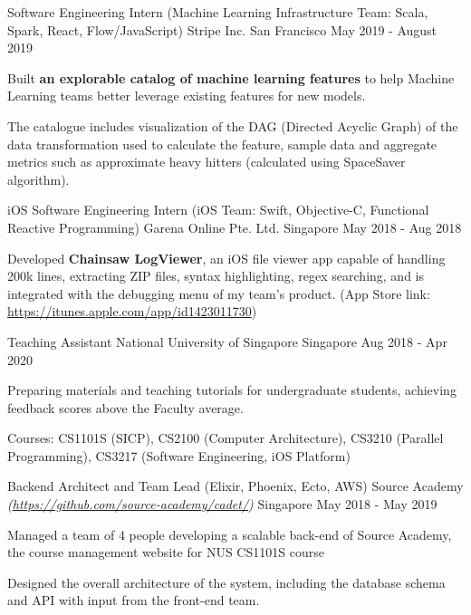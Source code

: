 \begin{cventries}
  \cventry
  {Software Engineering Intern (Machine Learning Infrastructure Team: Scala, Spark, React, Flow/JavaScript)} %
  {Stripe Inc.} %
  {San Francisco} %
  {May 2019 - August 2019} %
  {
    \begin{cvitems}
      \item {Built \textbf{an explorable catalog of machine learning features} to help Machine Learning teams better leverage existing features for new models.}
      \item {The catalogue includes visualization of the DAG (Directed Acyclic Graph) of the data transformation used to calculate the feature, sample data and aggregate metrics such as approximate heavy hitters (calculated using SpaceSaver algorithm).}
    \end{cvitems}
  }

  \cventry
  {iOS Software Engineering Intern (iOS Team: Swift, Objective-C, Functional Reactive Programming)} %
  {Garena Online Pte. Ltd.} %
  {Singapore} %
  {May 2018 - Aug 2018} %
  {
    \begin{cvitems}
      \item {Developed \textbf{Chainsaw LogViewer}, an iOS file viewer app capable of handling 200k lines, extracting ZIP files, syntax highlighting, regex searching, and is integrated with the debugging menu of my team's product. (App Store link: \url{https://itunes.apple.com/app/id1423011730})}
    \end{cvitems}
  }

  \cventry
  {Teaching Assistant} %
  {National University of Singapore} %
  {Singapore} %
  {Aug 2018 - Apr 2020} %
  {
    \begin{cvitems}
      \item {Preparing materials and teaching tutorials for undergraduate students, achieving feedback scores above the Faculty average.}
      \item {Courses: CS1101S (SICP), CS2100 (Computer Architecture), CS3210 (Parallel Programming), CS3217 (Software Engineering, iOS Platform)}
    \end{cvitems}
  }

  \cventry
  {Backend Architect and Team Lead (Elixir, Phoenix, Ecto, AWS)} %
  {Source Academy \textmd{\em\tiny(\url{https://github.com/source-academy/cadet/})}} %
  {Singapore} %
  {May 2018 - May 2019} %
  {
    \begin{cvitems}
      \item {Managed a team of 4 people developing a scalable back-end of Source Academy, the course management website for NUS CS1101S course}
      \item {Designed the overall architecture of the system, including the database schema and API with input from the front-end team.}
    \end{cvitems}
  }

\end{cventries}
